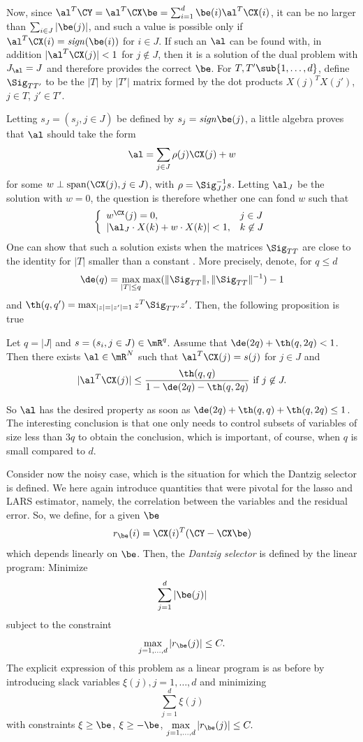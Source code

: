 Now, since $\al^T\CY = \al^T\CX\be = \sum_{i=1}^d \be(i) \al^T\CX(i)$,
it can be no larger than $\sum_{i\in J} |\be(j)|$, and such a value is
possible only if $\al^T\CX(i) = \mathit{sign}(\be(i))$ for $i\in
J$. If such an $\al$ can be found with, in addition $|\al^T\CX(j)|<1$
for $j\not \in J$, then it is a solution of the dual problem with
$J_\al = J$ and therefore provides the correct $\be$. For $T,T'\sub
\{1, \ldots, d\}$, define 
$\Sig_{TT'}$ to be the $|T|$ by $|T'|$ matrix formed by the dot
products $X(j)^TX(j')$, $j\in T$, $j'\in T'$.

Letting $s_J =
(s_j, j\in J)$ be defined by  $s_j = \mathit{sign} \be(j)$, a little
algebra proves that $\al$ should take the form
$$
\al = \sum_{j\in J} \rho(j) \CX(j) + w
$$
for some $w\perp \mathrm{span}(\CX(j), j\in J)$, with $\rho = \Sig_{JJ}^{-1}
s$. Letting $\al_J$ be the solution with $w=0$, the question is
therefore whether one can fond $w$ such that
$$
\left\{\begin{array}{ll}
w^\CX(j) = 0, & j\in J\\
|\al_J\cdot X(k) + w\cdot X(k)| < 1, & k\not \in J
\end{array}
\right.
$$
One can show that such a solution exists when the matrices
$\Sig_{TT}$ are close to the identity for $|T|$ smaller than a
constant \cite{ct05}. More precisely, denote, for $q\leq d$
$$
\de(q) =\max_{|T| \leq q} \max(\|\Sig_{TT}\|, \|\Sig_{TT}\|^{-1}) - 1
$$
and
$\th(q,q') = \max_{|z| = |z'| = 1} z^T \Sig_{TT'} z'$. Then, the
following proposition is true
\begin{proposition}
Let $q = |J|$ and $s = (s_i, j\in J)\in \mR^q$. Assume that $\de(2q)
+ \th(q,2q) <1$. Then there exists $\al\in \mR^N$ such that
$\al^T\CX(j) = s(j)$ for $j\in J$ and
$$
|\al^T\CX(j)| \leq \frac{\th(q,q)}{1-\de(2q) - \th(q,2q)} \text{ if }
j\not\in J.
$$
\end{proposition}
So $\al$ has the desired property as soon as $\de(2q) + \th(q,q) +
\th(q,2q) \leq 1$. The interesting conclusion is that one only needs
to control subsets of variables of size less than $3q$ to obtain the
conclusion, which is important, of course, when $q$ is small compared to
$d$.


\bigskip

Consider now the noisy case, which is the situation for which the
Dantzig selector is defined. We here again introduce quantities that
were pivotal for the lasso and LARS estimator, namely, the correlation
between the variables and the residual error. So, we define, for a
given $\be$
$$
r_\be(i) = \CX(i)^T(\CY - \CX\be)
$$
which depends linearly on $\be$. Then, the {\em Dantzig selector} is defined
by the linear program: Minimize
$$
\sum_{j=1}^d |\be(j)|
$$
subject to the constraint 
$$
\max\limits_{j=1, \ldots, d} |r_\be(j)| \leq C.
$$
The explicit expression of this problem as a linear program is as
before by introducing slack variables $\xi(j), j=1, \ldots, d$ and
minimizing 
$$
\sum_{j=1}^d \xi(j)
$$
with constraints $\xi \geq \be$, $\xi\geq -\be$, $
\max\limits_{j=1, \ldots, d} |r_\be(j)| \leq C.
$

